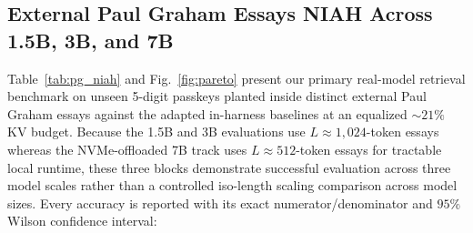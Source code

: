 \documentclass[conference]{IEEEtran}
\begin{document}
\subsection{External Paul Graham Essays NIAH Across 1.5B, 3B, and 7B}
Table~\ref{tab:pg_niah} and Fig.~\ref{fig:pareto} present our primary real-model retrieval benchmark on unseen 5-digit passkeys planted inside distinct external Paul Graham essays against the adapted in-harness baselines at an equalized $\sim 21\%$ KV budget. Because the 1.5B and 3B evaluations use $L \approx 1{,}024$-token essays whereas the NVMe-offloaded 7B track uses $L \approx 512$-token essays for tractable local runtime, these three blocks demonstrate successful evaluation across three model scales rather than a controlled iso-length scaling comparison across model sizes. Every accuracy is reported with its exact numerator/denominator and $95\%$ Wilson confidence interval:
\end{document}
